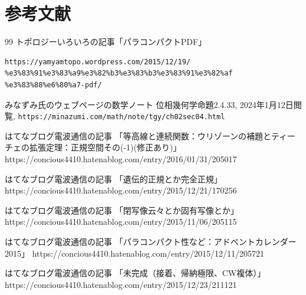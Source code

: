 \documentclass[leqno, a4paper, 12pt]{jsarticle}
\begin{document}
\section*{参考文献}

\renewcommand{\refname}{参考にしたウェブページ}
	
\begin{thebibliography}{99}
トポロジーいろいろの記事「パラコンパクトPDF」
\begin{verbatim}
https://yamyamtopo.wordpress.com/2015/12/19/
%e3%83%91%e3%83%a9%e3%82%b3%e3%83%b3%e3%83%91%e3%82%af
%e3%83%88%e6%80%a7-pdf/
\end{verbatim}



みなずみ氏のウェブページの数学ノート
位相幾何学命題2.4.33, 
2024年1月12日閲覧, 
\verb|https://minazumi.com/math/note/tgy/ch02sec04.html|



はてなブログ電波通信の記事
「等高線と連続関数：ウリゾーンの補題とティーチェの拡張定理：正規空間その(-1)(修正あり)」
https://concious4410.hatenablog.com/entry/2016/01/31/205017

はてなブログ電波通信の記事
「遺伝的正規とか完全正規」
https://concious4410.hatenablog.com/entry/2015/12/21/170256

はてなブログ電波通信の記事
「閉写像云々とか固有写像とか」
https://concious4410.hatenablog.com/entry/2015/11/06/205115


はてなブログ電波通信の記事
「パラコンパクト性など：アドベントカレンダー2015」
https://concious4410.hatenablog.com/entry/2015/12/11/205721


はてなブログ電波通信の記事
「未完成（接着、帰納極限、CW複体）」
https://concious4410.hatenablog.com/entry/2015/12/23/211121
\end{thebibliography}

\renewcommand{\refname}{一般の参考文献}



\nocite{*}


\end{document}
